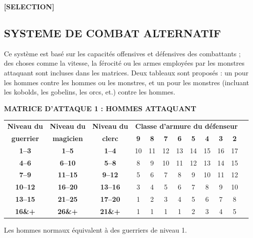\documentclass[11pt]{article}
\begin{document}
{\begin{center}
\textbf{[SELECTION]}
\end{center}

\subsection*{SYSTEME DE COMBAT ALTERNATIF}

Ce système est basé sur les capacités offensives et défensives des combattants ; des choses comme la vitesse, la férocité ou les armes employées par les monstres attaquant sont incluses dans les matrices. Deux tableaux sont proposés : un pour les hommes contre les hommes ou les monstres, et un pour les monstres (incluant les kobolds, les gobelins, les orcs, et.) contre les hommes.

\bigskip

\textbf{MATRICE D'ATTAQUE 1 : HOMMES ATTAQUANT}

\bigskip

\begin{tabular}{cccccccccccc}
\textbf{Niveau du } & \textbf{Niveau du } & \textbf{Niveau du } & \multicolumn{8}{c}{\textbf{Classe d'armure du défenseur}} \\
\textbf{guerrier}   & \textbf{magicien}   & \textbf{clerc}   & \textbf{9} & \textbf{8} & \textbf{7} & \textbf{6} & \textbf{5} & \textbf{4} & \textbf{3} & \textbf{2} \\
\textbf{1--3}   & \textbf{1--5}   & \textbf{1--4}   & 10 & 11 & 12 & 13 & 14 & 15 & 16 & 17 \\
\textbf{4--6}   & \textbf{6--10}  & \textbf{5--8}   &  8 &  9 & 10 & 11 & 12 & 13 & 14 & 15 \\
\textbf{7--9}   & \textbf{11--15} & \textbf{9--12}  &  5 &  6 &  7 &  8 &  9 & 10 & 11 & 12 \\
\textbf{10--12} & \textbf{16--20} & \textbf{13--16} &  3 &  4 &  5 &  6 &  7 &  8 &  9 & 10 \\
\textbf{13--15} & \textbf{21--25} & \textbf{17--20} &  1 &  2 &  3 &  4 &  5 &  6 &  7 &  8 \\
\textbf{16\&+}  & \textbf{26\&+}  & \textbf{21\&+}  &  1 &  1 &  1 &  1 &  2 &  3 &  4 &  5 \\
\end{tabular}

\bigskip

Les hommes normaux équivalent à des guerriers de niveau 1.

}
\end{document}
